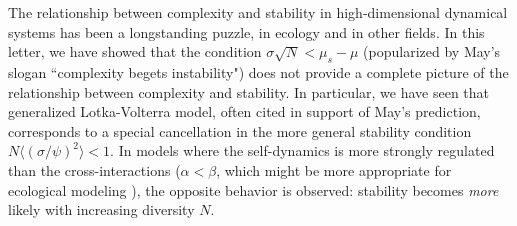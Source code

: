 
The relationship between complexity and stability in high-dimensional dynamical systems has been a longstanding puzzle, in ecology and in other fields. 
In this letter, we have showed that the condition $\sigma\sqrt{N}< \mu_s - \mu$ (popularized by May's slogan ``complexity begets instability") does not provide a complete picture of the relationship between complexity and stability. 
In particular, we have seen that generalized Lotka-Volterra model, often cited in support of May's prediction, corresponds to a special cancellation in the more general stability condition $N\langle (\sigma/\psi)^2\rangle < 1$.
In models where the self-dynamics is more strongly regulated than the cross-interactions ($\alpha < \beta$, which might be more appropriate for ecological modeling \cite{Hatton2023}), the opposite behavior is observed: stability becomes \emph{more} likely with increasing diversity $N$. 